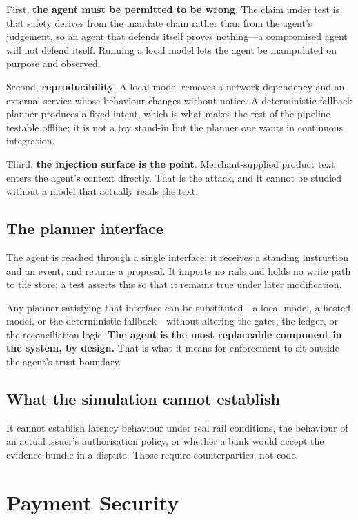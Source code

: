 \documentclass[journal,onecolumn,11pt]{IEEEtran}
\begin{document}
First, \textbf{the agent must be permitted to be wrong}. The claim under test is that
safety derives from the mandate chain rather than from the agent's judgement, so an
agent that defends itself proves nothing---a compromised agent will not defend itself.
Running a local model lets the agent be manipulated on purpose and observed.

Second, \textbf{reproducibility}. A local model removes a network dependency and an
external service whose behaviour changes without notice. A deterministic fallback
planner produces a fixed intent, which is what makes the rest of the pipeline testable
offline; it is not a toy stand-in but the planner one wants in continuous integration.

Third, \textbf{the injection surface is the point}. Merchant-supplied product text
enters the agent's context directly. That is the attack, and it cannot be studied
without a model that actually reads the text.

\subsection{The planner interface}
The agent is reached through a single interface: it receives a standing instruction and
an event, and returns a proposal. It imports no rails and holds no write path to the
store; a test asserts this so that it remains true under later modification.

Any planner satisfying that interface can be substituted---a local model, a hosted
model, or the deterministic fallback---without altering the gates, the ledger, or the
reconciliation logic. \textbf{The agent is the most replaceable component in the system,
by design.} That is what it means for enforcement to sit outside the agent's trust
boundary.

\subsection{What the simulation cannot establish}
It cannot establish latency behaviour under real rail conditions, the behaviour of an
actual issuer's authorisation policy, or whether a bank would accept the evidence bundle
in a dispute. Those require counterparties, not code.

\section{Payment Security}\label{sec:sec}
\end{document}
